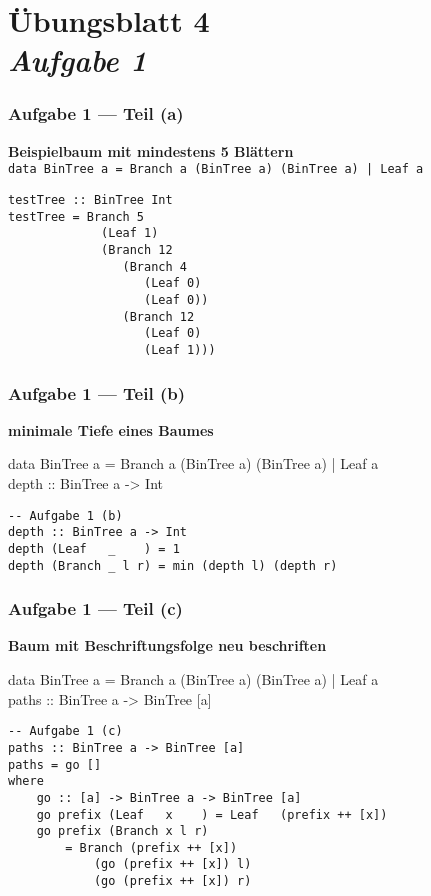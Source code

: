 \documentclass{beamer}
\begin{document}
\section{Übungsblatt 4 \\ \textit{\normalsize Aufgabe 1}}

\begin{frame}[fragile, t] \frametitle{Aufgabe 1 --- Teil (a)}
	\textbf{Beispielbaum mit mindestens 5 Blättern} \\
	\texttt{\small data BinTree a = Branch a (BinTree a) (BinTree a) | Leaf a}
	\pause
	\begin{lstlisting}
testTree :: BinTree Int
testTree = Branch 5
             (Leaf 1)
             (Branch 12
                (Branch 4
                   (Leaf 0)
                   (Leaf 0))
                (Branch 12
                   (Leaf 0)
                   (Leaf 1)))
	\end{lstlisting}
\end{frame}

\begin{frame}[fragile, t] \frametitle{Aufgabe 1 --- Teil (b)}
	\textbf{minimale Tiefe eines Baumes}
	
	\begin{ttfamily}
		{\small data BinTree a = Branch a (BinTree a) (BinTree a) | Leaf a} \\
		depth :: BinTree a -> Int
	\end{ttfamily}
	
	\bigskip \pause
	
	\begin{lstlisting}
-- Aufgabe 1 (b)
depth :: BinTree a -> Int
depth (Leaf   _    ) = 1
depth (Branch _ l r) = min (depth l) (depth r)
	\end{lstlisting}
\end{frame}


\begin{frame}[fragile, t] \frametitle{Aufgabe 1 --- Teil (c)}
	\textbf{Baum mit Beschriftungsfolge neu beschriften}
	
	\begin{ttfamily}
		{\small data BinTree a = Branch a (BinTree a) (BinTree a) | Leaf a} \\
		paths :: BinTree a -> BinTree [a]
	\end{ttfamily}
	
	\bigskip \pause
	
	\begin{lstlisting}
-- Aufgabe 1 (c)
paths :: BinTree a -> BinTree [a]
paths = go []
where
	go :: [a] -> BinTree a -> BinTree [a]
	go prefix (Leaf   x    ) = Leaf   (prefix ++ [x])
	go prefix (Branch x l r) 
		= Branch (prefix ++ [x]) 
			(go (prefix ++ [x]) l) 
			(go (prefix ++ [x]) r)
	\end{lstlisting}
\end{frame}
\end{document}
